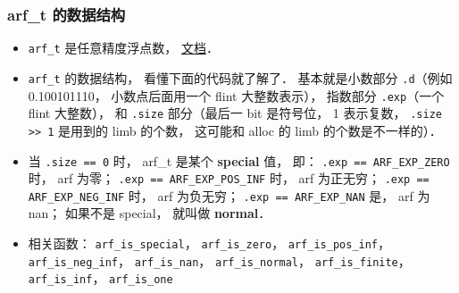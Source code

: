 \subsubsection{arf_t 的数据结构}
\begin{itemize}
\item \verb|arf_t| 是任意精度浮点数， \href{https://arblib.org/arf.html}{文档}．
\item \verb|arf_t| 的数据结构， 看懂下面的代码就了解了． 基本就是小数部分 \verb|.d|（例如 0.100101110， 小数点后面用一个 flint 大整数表示）， 指数部分 \verb|.exp|（一个 flint 大整数）， 和 \verb|.size| 部分（最后一 bit 是符号位， 1 表示复数， \verb|.size >> 1| 是用到的 limb 的个数， 这可能和 alloc 的 limb 的个数是不一样的）．
\item 当 \verb|.size == 0| 时， arf_t 是某个 \textbf{special} 值， 即： \verb|.exp == ARF_EXP_ZERO| 时， arf 为零； \verb|.exp == ARF_EXP_POS_INF| 时， arf 为正无穷； \verb|.exp == ARF_EXP_NEG_INF| 时， arf 为负无穷； \verb|.exp == ARF_EXP_NAN| 是， arf 为 nan； 如果不是 special， 就叫做 \textbf{normal}．
\item 相关函数： \verb|arf_is_special|， \verb|arf_is_zero|， \verb|arf_is_pos_inf|， \verb|arf_is_neg_inf|， \verb|arf_is_nan|， \verb|arf_is_normal|， \verb|arf_is_finite|， \verb|arf_is_inf|， \verb|arf_is_one|
\end{itemize}

